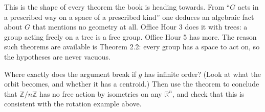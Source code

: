 \documentclass[10pt]{article}
\newcommand{\Z}{\mathbb{Z}}
\newcommand{\R}{\mathbb{R}}
\begin{document}
{\begin{minipage}[t]{744pt}
\begin{minipage}[t]{352pt}
\begin{pitfall}
\end{pitfall}
\begin{bigpic}
This is the shape of every theorem the book is heading towards. From ``$G$ acts in a prescribed way on a space of a prescribed kind'' one deduces an algebraic fact about $G$ that mentions no geometry at all. Office Hour 3 does it with trees: a group acting freely on a tree is a free group. Office Hour 5 has more. The reason such theorems are available is Theorem 2.2: every group has a space to act on, so the hypotheses are never vacuous.
\end{bigpic}
\begin{tryit}
Where exactly does the argument break if $g$ has infinite order? (Look at what the orbit becomes, and whether it has a centroid.) Then use the theorem to conclude that $\Z/n\Z$ has no free action by isometries on any $\R^n$, and check that this is consistent with the rotation example above.
\end{tryit}
\end{minipage}
\end{minipage}
}
\end{document}
